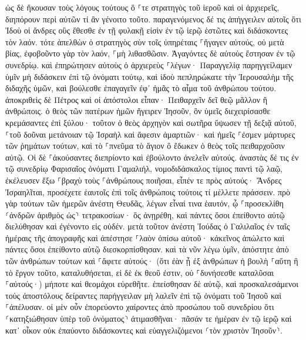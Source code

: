 \documentclass[twoside, 9pt]{extreport}
\begin{document}
ὡς δὲ ἤκουσαν τοὺς λόγους τούτους ὅ ⸀τε στρατηγὸς τοῦ ἱεροῦ καὶ οἱ ἀρχιερεῖς, διηπόρουν περὶ αὐτῶν τί ἂν γένοιτο τοῦτο. 
παραγενόμενος δέ τις ἀπήγγειλεν αὐτοῖς ὅτι Ἰδοὺ οἱ ἄνδρες οὓς ἔθεσθε ἐν τῇ φυλακῇ εἰσὶν ἐν τῷ ἱερῷ ἑστῶτες καὶ διδάσκοντες τὸν λαόν. 
τότε ἀπελθὼν ὁ στρατηγὸς σὺν τοῖς ὑπηρέταις ⸀ἤγαγεν αὐτούς, οὐ μετὰ βίας, ἐφοβοῦντο γὰρ τὸν λαόν, ⸀μὴ λιθασθῶσιν. 
Ἀγαγόντες δὲ αὐτοὺς ἔστησαν ἐν τῷ συνεδρίῳ. καὶ ἐπηρώτησεν αὐτοὺς ὁ ἀρχιερεὺς 
⸀λέγων· Παραγγελίᾳ παρηγγείλαμεν ὑμῖν μὴ διδάσκειν ἐπὶ τῷ ὀνόματι τούτῳ, καὶ ἰδοὺ πεπληρώκατε τὴν Ἰερουσαλὴμ τῆς διδαχῆς ὑμῶν, καὶ βούλεσθε ἐπαγαγεῖν ἐφ᾽ ἡμᾶς τὸ αἷμα τοῦ ἀνθρώπου τούτου. 
ἀποκριθεὶς δὲ Πέτρος καὶ οἱ ἀπόστολοι εἶπαν· Πειθαρχεῖν δεῖ θεῷ μᾶλλον ἢ ἀνθρώποις. 
ὁ θεὸς τῶν πατέρων ἡμῶν ἤγειρεν Ἰησοῦν, ὃν ὑμεῖς διεχειρίσασθε κρεμάσαντες ἐπὶ ξύλου· 
τοῦτον ὁ θεὸς ἀρχηγὸν καὶ σωτῆρα ὕψωσεν τῇ δεξιᾷ αὐτοῦ, ⸀τοῦ δοῦναι μετάνοιαν τῷ Ἰσραὴλ καὶ ἄφεσιν ἁμαρτιῶν· 
καὶ ἡμεῖς ⸀ἐσμεν μάρτυρες τῶν ῥημάτων τούτων, καὶ τὸ ⸀πνεῦμα τὸ ἅγιον ὃ ἔδωκεν ὁ θεὸς τοῖς πειθαρχοῦσιν αὐτῷ. 
Οἱ δὲ ⸀ἀκούσαντες διεπρίοντο καὶ ἐβούλοντο ἀνελεῖν αὐτούς. 
ἀναστὰς δέ τις ἐν τῷ συνεδρίῳ Φαρισαῖος ὀνόματι Γαμαλιήλ, νομοδιδάσκαλος τίμιος παντὶ τῷ λαῷ, ἐκέλευσεν ἔξω ⸀βραχὺ τοὺς ⸀ἀνθρώπους ποιῆσαι, 
εἶπέν τε πρὸς αὐτούς· Ἄνδρες Ἰσραηλῖται, προσέχετε ἑαυτοῖς ἐπὶ τοῖς ἀνθρώποις τούτοις τί μέλλετε πράσσειν. 
πρὸ γὰρ τούτων τῶν ἡμερῶν ἀνέστη Θευδᾶς, λέγων εἶναί τινα ἑαυτόν, ᾧ ⸀προσεκλίθη ⸂ἀνδρῶν ἀριθμὸς ὡς⸃ τετρακοσίων· ὃς ἀνῃρέθη, καὶ πάντες ὅσοι ἐπείθοντο αὐτῷ διελύθησαν καὶ ἐγένοντο εἰς οὐδέν. 
μετὰ τοῦτον ἀνέστη Ἰούδας ὁ Γαλιλαῖος ἐν ταῖς ἡμέραις τῆς ἀπογραφῆς καὶ ἀπέστησε ⸀λαὸν ὀπίσω αὐτοῦ· κἀκεῖνος ἀπώλετο καὶ πάντες ὅσοι ἐπείθοντο αὐτῷ διεσκορπίσθησαν. 
καὶ τὰ νῦν λέγω ὑμῖν, ἀπόστητε ἀπὸ τῶν ἀνθρώπων τούτων καὶ ⸀ἄφετε αὐτούς· (ὅτι ἐὰν ᾖ ἐξ ἀνθρώπων ἡ βουλὴ ⸀αὕτη ἢ τὸ ἔργον τοῦτο, καταλυθήσεται, 
εἰ δὲ ἐκ θεοῦ ἐστιν, οὐ ⸀δυνήσεσθε καταλῦσαι ⸀αὐτούς·) μήποτε καὶ θεομάχοι εὑρεθῆτε. ἐπείσθησαν δὲ αὐτῷ, 
καὶ προσκαλεσάμενοι τοὺς ἀποστόλους δείραντες παρήγγειλαν μὴ λαλεῖν ἐπὶ τῷ ὀνόματι τοῦ Ἰησοῦ καὶ ⸀ἀπέλυσαν. 
οἱ μὲν οὖν ἐπορεύοντο χαίροντες ἀπὸ προσώπου τοῦ συνεδρίου ὅτι ⸂κατηξιώθησαν ὑπὲρ τοῦ ὀνόματος⸃ ἀτιμασθῆναι· 
πᾶσάν τε ἡμέραν ἐν τῷ ἱερῷ καὶ κατ᾽ οἶκον οὐκ ἐπαύοντο διδάσκοντες καὶ εὐαγγελιζόμενοι ⸂τὸν χριστὸν Ἰησοῦν⸃. 
\end{document}
